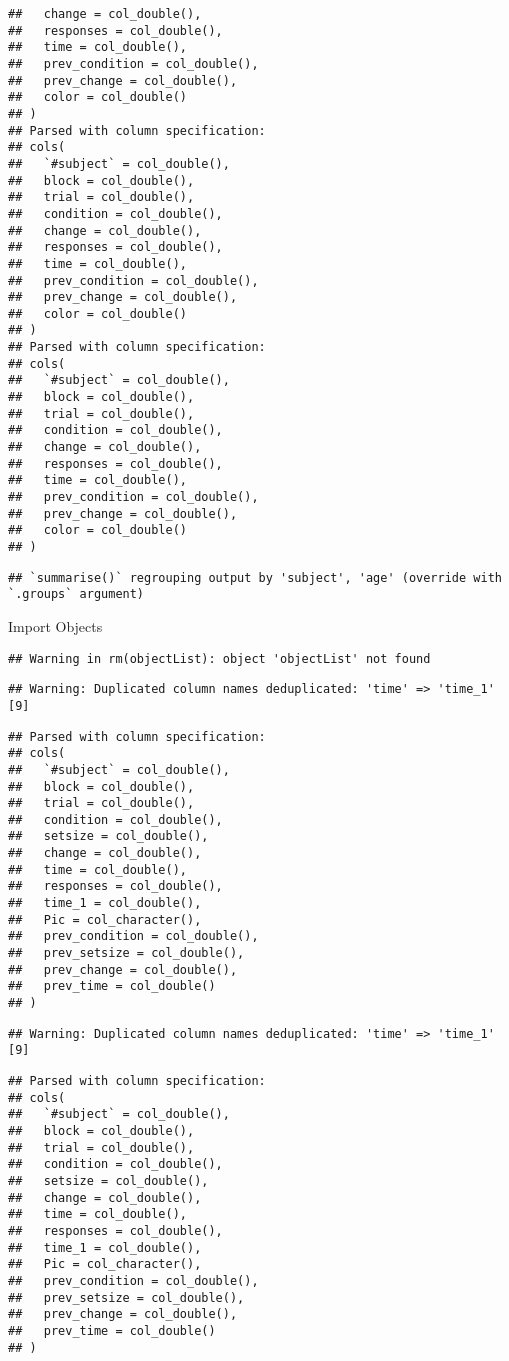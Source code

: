 \documentclass[
]{article}
\begin{document}
\begin{verbatim}
##   change = col_double(),
##   responses = col_double(),
##   time = col_double(),
##   prev_condition = col_double(),
##   prev_change = col_double(),
##   color = col_double()
## )
## Parsed with column specification:
## cols(
##   `#subject` = col_double(),
##   block = col_double(),
##   trial = col_double(),
##   condition = col_double(),
##   change = col_double(),
##   responses = col_double(),
##   time = col_double(),
##   prev_condition = col_double(),
##   prev_change = col_double(),
##   color = col_double()
## )
## Parsed with column specification:
## cols(
##   `#subject` = col_double(),
##   block = col_double(),
##   trial = col_double(),
##   condition = col_double(),
##   change = col_double(),
##   responses = col_double(),
##   time = col_double(),
##   prev_condition = col_double(),
##   prev_change = col_double(),
##   color = col_double()
## )
\end{verbatim}

\begin{verbatim}
## `summarise()` regrouping output by 'subject', 'age' (override with `.groups` argument)
\end{verbatim}

Import Objects

\begin{verbatim}
## Warning in rm(objectList): object 'objectList' not found
\end{verbatim}

\begin{verbatim}
## Warning: Duplicated column names deduplicated: 'time' => 'time_1' [9]
\end{verbatim}

\begin{verbatim}
## Parsed with column specification:
## cols(
##   `#subject` = col_double(),
##   block = col_double(),
##   trial = col_double(),
##   condition = col_double(),
##   setsize = col_double(),
##   change = col_double(),
##   time = col_double(),
##   responses = col_double(),
##   time_1 = col_double(),
##   Pic = col_character(),
##   prev_condition = col_double(),
##   prev_setsize = col_double(),
##   prev_change = col_double(),
##   prev_time = col_double()
## )
\end{verbatim}

\begin{verbatim}
## Warning: Duplicated column names deduplicated: 'time' => 'time_1' [9]
\end{verbatim}

\begin{verbatim}
## Parsed with column specification:
## cols(
##   `#subject` = col_double(),
##   block = col_double(),
##   trial = col_double(),
##   condition = col_double(),
##   setsize = col_double(),
##   change = col_double(),
##   time = col_double(),
##   responses = col_double(),
##   time_1 = col_double(),
##   Pic = col_character(),
##   prev_condition = col_double(),
##   prev_setsize = col_double(),
##   prev_change = col_double(),
##   prev_time = col_double()
## )
\end{verbatim}
\end{document}
